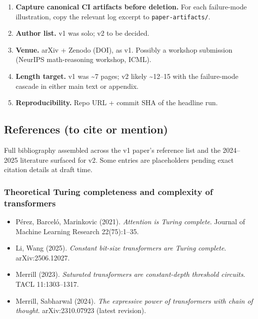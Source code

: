 \documentclass[twocolumn,switch,10pt]{article}
\providecommand{\tightlist}{\setlength{\itemsep}{0pt}\setlength{\parskip}{0pt}}
\begin{document}
\begin{enumerate}
\def\labelenumi{\arabic{enumi}.}
\tightlist
\item
  \textbf{Capture canonical CI artifacts before deletion.} For each
  failure-mode illustration, copy the relevant log excerpt to
  \texttt{paper-artifacts/}.
\item
  \textbf{Author list.} v1 was solo; v2 to be decided.
\item
  \textbf{Venue.} arXiv + Zenodo (DOI), as v1. Possibly a workshop
  submission (NeurIPS math-reasoning workshop, ICML).
\item
  \textbf{Length target.} v1 was \textasciitilde7 pages; v2 likely \textasciitilde12--15 with the
  failure-mode cascade in either main text or appendix.
\item
  \textbf{Reproducibility.} Repo URL + commit SHA of the headline run.
\end{enumerate}

\subsection{References (to cite or mention)}\label{references-to-cite-or-mention}

Full bibliography assembled across the v1 paper's reference list and
the 2024--2025 literature surfaced for v2. Some entries are placeholders
pending exact citation details at draft time.

\subsubsection{Theoretical Turing completeness and complexity of transformers}\label{theoretical-turing-completeness-and-complexity-of-transformers}

\begin{itemize}
\tightlist
\item
  Pérez, Barceló, Marinkovic (2021). \emph{Attention is Turing complete}.
  Journal of Machine Learning Research 22(75):1--35.
\item
  Li, Wang (2025). \emph{Constant bit-size transformers are Turing complete}.
  arXiv:2506.12027.
\item
  Merrill (2023). \emph{Saturated transformers are constant-depth threshold
  circuits}. TACL 11:1303--1317.
\item
  Merrill, Sabharwal (2024). \emph{The expressive power of transformers
  with chain of thought}. arXiv:2310.07923 (latest revision).
\end{itemize}
\end{document}
